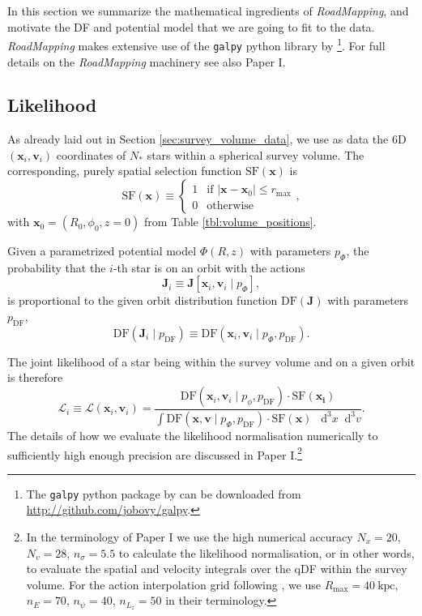 \documentclass[iop,revtex4,numberedappendix,appendixfloats]{emulateapj}
\newcommand{\vect}[1]{\boldsymbol{#1}}
\newcommand*\Diff[1]{\mathop{}\!\mathrm{d^#1}}
\newcommand{\RM}{{\sl RoadMapping}}
\begin{document}
In this section we summarize the mathematical ingredients of \RM{}, and motivate the DF and potential model that we are going to fit to the data. \RM{} makes extensive use of the \texttt{galpy} python library by \citet{2015ApJS..216...29B}\footnote{The \texttt{galpy} python package by \citet{2015ApJS..216...29B} can be downloaded from \url{http://github.com/jobovy/galpy}.}. For full details on the \RM{} machinery see also Paper I.

\subsection{Likelihood} \label{sec:likelihood}

As already laid out in Section \ref{sec:survey_volume_data}, we use as data the 6D $(\vect{x}_i,\vect{v}_i)$ coordinates of $N_*$ stars within a spherical survey volume. The corresponding, purely spatial selection function $\text{SF}(\vect{x})$ is
\begin{equation}
\text{SF}(\vect{x}) \equiv \begin{cases} 1 &\mbox{if } \left| \vect{x}-\vect{x}_0 \right| \leq r_\text{max} \\
0 & \mbox{otherwise} \end{cases},
\end{equation}
with $\vect{x}_0 = (R_0,\phi_0,z=0)$ from Table \ref{tbl:volume_positions}.

Given a parametrized potential model $\Phi(R,z)$ with parameters $p_\Phi$, the probability that the $i$-th star is on an orbit with the actions 
\begin{equation}
\vect{J}_i \equiv \vect{J}[\vect{x}_i,\vect{v}_i \mid p_\Phi],
\end{equation}
is proportional to the given orbit distribution function $\text{DF}(\vect{J})$ with parameters $p_\text{DF}$,
\begin{equation}
\text{DF}(\vect{J}_i \mid p_\text{DF}) \equiv \text{DF}(\vect{x}_i,\vect{v}_i \mid p_\Phi,p_\text{DF}).
\end{equation}

The joint likelihood of a star being within the survey volume and on a given orbit is therefore
\begin{equation}
\mathscr{L}_i \equiv \mathscr{L}(\vect{x}_i,\vect{v}_i) = \frac{\text{DF}(\vect{x}_i,\vect{v}_i\mid p_\phi, p_\text{DF}) \cdot \text{SF}(\vect{x_i})}{\int \text{DF}(\vect{x},\vect{v}\mid p_\Phi, p_\text{DF}) \cdot \text{SF}(\vect{x}) \ \Diff3 x \Diff3 v}.
\end{equation}
The details of how we evaluate the likelihood normalisation numerically to sufficiently high enough precision are discussed in Paper I.\footnote{In the terminology of Paper I we use the high numerical accuracy $N_x = 20$, $N_v = 28$, $n_\sigma = 5.5$ to calculate the likelihood normalisation, or in other words, to evaluate the spatial and velocity integrals over the qDF within the survey volume. For the action interpolation grid following \citet{2015ApJS..216...29B}, we use $R_\text{max}=40~\text{kpc}$, $n_E=70$, $n_\psi=40$, $n_{L_z}=50$ in their terminology.}
\end{document}

